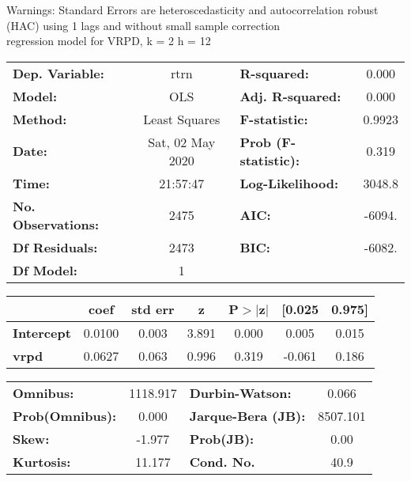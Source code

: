 Warnings: \newline
 [1] Standard Errors are heteroscedasticity and autocorrelation robust (HAC) using 1 lags and without small sample correction\\ 

regression model for VRPD, k = 2 h = 12\begin{center}
\begin{tabular}{lclc}
\toprule
\textbf{Dep. Variable:}    &       rtrn       & \textbf{  R-squared:         } &     0.000   \\
\textbf{Model:}            &       OLS        & \textbf{  Adj. R-squared:    } &     0.000   \\
\textbf{Method:}           &  Least Squares   & \textbf{  F-statistic:       } &    0.9923   \\
\textbf{Date:}             & Sat, 02 May 2020 & \textbf{  Prob (F-statistic):} &    0.319    \\
\textbf{Time:}             &     21:57:47     & \textbf{  Log-Likelihood:    } &    3048.8   \\
\textbf{No. Observations:} &        2475      & \textbf{  AIC:               } &    -6094.   \\
\textbf{Df Residuals:}     &        2473      & \textbf{  BIC:               } &    -6082.   \\
\textbf{Df Model:}         &           1      & \textbf{                     } &             \\
\bottomrule
\end{tabular}
\begin{tabular}{lcccccc}
                   & \textbf{coef} & \textbf{std err} & \textbf{z} & \textbf{P$> |$z$|$} & \textbf{[0.025} & \textbf{0.975]}  \\
\midrule
\textbf{Intercept} &       0.0100  &        0.003     &     3.891  &         0.000        &        0.005    &        0.015     \\
\textbf{vrpd}      &       0.0627  &        0.063     &     0.996  &         0.319        &       -0.061    &        0.186     \\
\bottomrule
\end{tabular}
\begin{tabular}{lclc}
\textbf{Omnibus:}       & 1118.917 & \textbf{  Durbin-Watson:     } &    0.066  \\
\textbf{Prob(Omnibus):} &   0.000  & \textbf{  Jarque-Bera (JB):  } & 8507.101  \\
\textbf{Skew:}          &  -1.977  & \textbf{  Prob(JB):          } &     0.00  \\
\textbf{Kurtosis:}      &  11.177  & \textbf{  Cond. No.          } &     40.9  \\
\bottomrule
\end{tabular}
\end{center}

